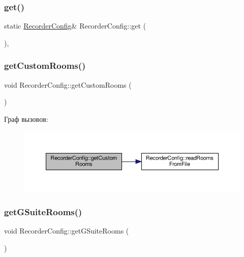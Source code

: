 \subsubsection{\texorpdfstring{get()}{get()}}
{\footnotesize\ttfamily static \hyperlink{class_recorder_config}{Recorder\+Config}\& Recorder\+Config\+::get (\begin{DoxyParamCaption}{ }\end{DoxyParamCaption})\hspace{0.3cm}{\ttfamily [inline]}, {\ttfamily [static]}}

\mbox{\label{class_recorder_config_a1a24b616ff9ca5beac0bb37210da9ef1}} 
\subsubsection{\texorpdfstring{get\+Custom\+Rooms()}{getCustomRooms()}}
{\footnotesize\ttfamily void Recorder\+Config\+::get\+Custom\+Rooms (\begin{DoxyParamCaption}{ }\end{DoxyParamCaption})\hspace{0.3cm}{\ttfamily [private]}}

Граф вызовов\+:\nopagebreak
\begin{figure}[H]
\begin{center}
\leavevmode
\includegraphics[width=350pt]{class_recorder_config_a1a24b616ff9ca5beac0bb37210da9ef1_cgraph}
\end{center}
\end{figure}
\mbox{\label{class_recorder_config_ae74d1af712e9684786ed33f67a8eeda3}} 
\subsubsection{\texorpdfstring{get\+G\+Suite\+Rooms()}{getGSuiteRooms()}}
{\footnotesize\ttfamily void Recorder\+Config\+::get\+G\+Suite\+Rooms (\begin{DoxyParamCaption}{ }\end{DoxyParamCaption})\hspace{0.3cm}{\ttfamily [private]}}

